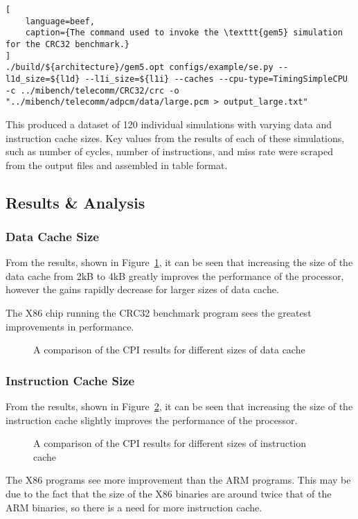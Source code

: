 \begin{lstlisting}[
    language=beef,
    caption={The command used to invoke the \texttt{gem5} simulation for the CRC32 benchmark.}
]
./build/${architecture}/gem5.opt configs/example/se.py --l1d_size=${l1d} --l1i_size=${l1i} --caches --cpu-type=TimingSimpleCPU -c ../mibench/telecomm/CRC32/crc -o "../mibench/telecomm/adpcm/data/large.pcm > output_large.txt"
\end{lstlisting}

This produced a dataset of 120 individual simulations with varying data and instruction
cache sizes.
Key values from the results of each of these simulations, such as number of cycles,
number of instructions, and miss rate were scraped from the output files and assembled
in table format.

\subsection{Results \& Analysis}

\subsubsection{Data Cache Size}

From the results, shown in Figure~\ref{fig:parta-l1d},
it can be seen that increasing the size of the data cache from 2kB to
4kB greatly improves the performance of the processor, however the gains rapidly
decrease for larger sizes of data cache.

The X86 chip running the CRC32 benchmark program sees the greatest improvements in
performance.

\begin{figure}[H]
    \centering
    
    \caption{A comparison of the CPI results for different sizes of data cache}
    \label{fig:parta-l1d}
\end{figure}

\subsubsection{Instruction Cache Size}

From the results, shown in Figure~\ref{fig:parta-l1i},
it can be seen that increasing the size of the instruction cache
slightly improves the performance of the processor.

\begin{figure}[H]
    \centering
    
    \caption{A comparison of the CPI results for different sizes of instruction cache}
    \label{fig:parta-l1i}
\end{figure}

The X86 programs see more improvement than the ARM programs.
This may be due to the fact that the size of the X86 binaries are around twice that of
the ARM binaries, so there is a need for more instruction cache.
